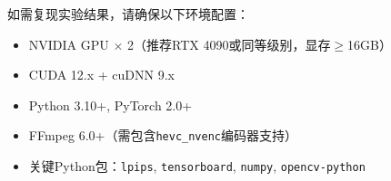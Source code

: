 如需复现实验结果，请确保以下环境配置：
\begin{itemize}
  \item NVIDIA GPU $\times$ 2（推荐RTX 4090或同等级别，显存$\geq$16GB）
  \item CUDA 12.x + cuDNN 9.x
  \item Python 3.10+, PyTorch 2.0+
  \item FFmpeg 6.0+（需包含\texttt{hevc\_nvenc}编码器支持）
  \item 关键Python包：\texttt{lpips}, \texttt{tensorboard}, \texttt{numpy}, \texttt{opencv-python}
\end{itemize}
